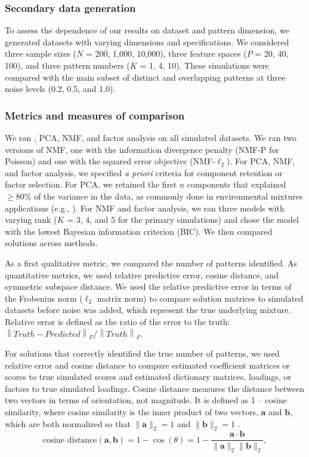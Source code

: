 \subsubsection{Secondary data generation} 
To assess the dependence of our results on dataset and pattern dimension, we generated datasets with varying dimensions and specifications. We considered three sample sizes ($N$ = 200, 1,000, 10,000), three feature spaces ($P$ = 20, 40, 100), and three pattern numbers ($K$ = 1, 4, 10). These simulations were compared with the main subset of distinct and overlapping patterns at three noise levels (0.2, 0.5, and 1.0).

\subsubsection{Metrics and measures of comparison}
\label{methods_metrics}
We ran \bnmfc, PCA, NMF, and factor analysis on all simulated datasets. We ran two versions of NMF, one with the information divergence penalty (NMF-P for Poisson) and one with the squared error objective (NMF-$\ell_2$). For PCA, NMF, and factor analysis, we specified \textit{a priori} criteria for component retention or factor selection. For PCA, we retained the first $n$ components that explained $\geq 80\%$ of the variance in the data, as commonly done in environmental mixtures applications (e.g., \cite{gibson2019overview}). For NMF and factor analysis, we ran three models with varying rank ($K$ = 3, 4, and 5 for the primary simulations) and chose the model with the lowest Bayesian information criterion (BIC). We then compared solutions across methods. 

As a first qualitative metric, we compared the number of patterns identified. As quantitative metrics, we used relative predictive error, cosine distance, and symmetric subspace distance. We used the relative predictive error in terms of the Frobenius norm ($\ell_2$ matrix norm) to compare solution matrices to simulated datasets before noise was added, which represent the true underlying mixture. Relative error is defined as the ratio of the error to the truth: $\left\lVert Truth - Predicted\right\rVert_F / \left\lVert  Truth\right\rVert_F$. 

For solutions that correctly identified the true number of patterns, we used relative error and cosine distance to compare estimated coefficient matrices or scores to true simulated scores and estimated dictionary matrices, loadings, or factors to true simulated loadings. Cosine distance measures the distance between two vectors in terms of orientation, not magnitude. It is defined as 1 -- cosine similarity, where cosine similarity is the inner product of two vectors, $\mathbf{a}$ and $\mathbf{b}$, which are both normalized so that $\|\mathbf{a}\|_2 = 1$ and $\|\mathbf{b}\|_2 = 1$ \citep{tan2016introduction}. 
\begin{equation}
\text{cosine distance}(\mathbf{a}, \mathbf{b}) = 1 - \cos (\theta)=1 - \frac{\mathbf{a} \cdot \mathbf{b}}{\|\mathbf{a}\|_2\|\mathbf{b}\|_2},
\end{equation}

